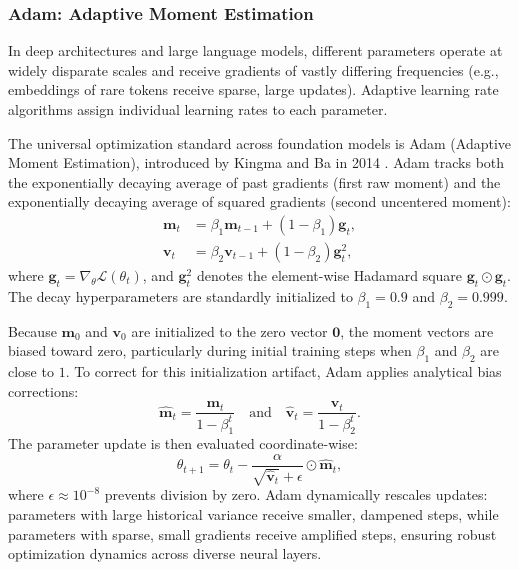 \documentclass[../../../main.tex]{subfiles}
\begin{document}
\subsubsection{Adam: Adaptive Moment Estimation}

In deep architectures and large language models, different parameters operate at widely disparate scales and receive gradients of vastly differing frequencies (e.g., embeddings of rare tokens receive sparse, large updates). Adaptive learning rate algorithms assign individual learning rates to each parameter.

The universal optimization standard across foundation models is Adam (Adaptive Moment Estimation), introduced by Kingma and Ba in 2014 \citep{kingma2014adam}. Adam tracks both the exponentially decaying average of past gradients (first raw moment) and the exponentially decaying average of squared gradients (second uncentered moment):
\begin{align}
\mathbf{m}_t &= \beta_1 \mathbf{m}_{t-1} + (1 - \beta_1) \mathbf{g}_t, \label{eq:adam_m} \\
\mathbf{v}_t &= \beta_2 \mathbf{v}_{t-1} + (1 - \beta_2) \mathbf{g}_t^2, \label{eq:adam_v}
\end{align}
where $\mathbf{g}_t = \nabla_\theta \mathcal{L}(\theta_t)$, and $\mathbf{g}_t^2$ denotes the element-wise Hadamard square $\mathbf{g}_t \odot \mathbf{g}_t$. The decay hyperparameters are standardly initialized to $\beta_1 = 0.9$ and $\beta_2 = 0.999$.

Because $\mathbf{m}_0$ and $\mathbf{v}_0$ are initialized to the zero vector $\mathbf{0}$, the moment vectors are biased toward zero, particularly during initial training steps when $\beta_1$ and $\beta_2$ are close to $1$. To correct for this initialization artifact, Adam applies analytical bias corrections:
\begin{equation}
\hat{\mathbf{m}}_t = \frac{\mathbf{m}_t}{1 - \beta_1^t} \quad \text{and} \quad \hat{\mathbf{v}}_t = \frac{\mathbf{v}_t}{1 - \beta_2^t}.
\end{equation}
The parameter update is then evaluated coordinate-wise:
\begin{equation}
\theta_{t+1} = \theta_t - \frac{\alpha}{\sqrt{\hat{\mathbf{v}}_t} + \epsilon} \odot \hat{\mathbf{m}}_t,
\end{equation}
where $\epsilon \approx 10^{-8}$ prevents division by zero. Adam dynamically rescales updates: parameters with large historical variance receive smaller, dampened steps, while parameters with sparse, small gradients receive amplified steps, ensuring robust optimization dynamics across diverse neural layers.
\end{document}
